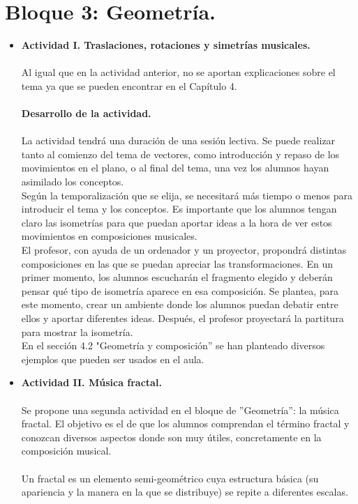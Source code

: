 \documentclass[a4paper, openright, 11pt, titlepage]{report}
\theoremstyle{definition}\newtheorem{defin}[propo]{Definition}
\theoremstyle{definition}\newtheorem{obser}[propo]{Remark}
\theoremstyle{definition}\newtheorem{ejem}[propo]{Ejemplo}
\theoremstyle{definition}\newtheorem{algoritmo}[propo]{Algoritmo}
\begin{document}
\section{Bloque 3: Geometría.}
\begin{itemize}
    \item \textbf{Actividad I. Traslaciones, rotaciones y simetrías musicales.}\\\\
    Al igual que en la actividad anterior, no se aportan explicaciones sobre el tema ya que se pueden encontrar en el Capítulo 4.\\\\
    \textbf{Desarrollo de la actividad.}\\\\
    La actividad tendrá una duración de una sesión lectiva. Se puede realizar tanto al comienzo del tema de vectores, como introducción y repaso de los movimientos en el plano, o al final del tema, una vez los alumnos hayan asimilado los conceptos.\\
    Según la temporalización que se elija, se necesitará más tiempo o menos para introducir el tema y los conceptos. Es importante que los alumnos tengan claro las isometrías para que puedan aportar ideas a la hora de ver estos movimientos en composiciones musicales.\\
    El profesor, con ayuda de un ordenador y un proyector, propondrá distintas composiciones en las que se puedan apreciar las transformaciones. En un primer momento, los alumnos escucharán el fragmento elegido y deberán pensar qué tipo de isometría aparece en esa composición. Se plantea, para este momento, crear un ambiente donde los alumnos puedan debatir entre ellos y aportar diferentes ideas. Después, el profesor proyectará la partitura para mostrar la isometría.\\
    En el sección 4.2 "Geometría y composición'' se han planteado diversos ejemplos que pueden ser usados en el aula.
    \item \textbf{Actividad II. Música fractal.}\\\\
    Se propone una segunda actividad en el bloque de ''Geometría'': la música fractal. El objetivo es el de que los alumnos comprendan el término fractal y conozcan diversos aspectos donde son muy útiles, concretamente en la composición musical.\\\\
    Un fractal es un elemento semi-geométrico cuya estructura básica (su apariencia y la manera en la que se distribuye) se repite a diferentes escalas.\\

\end{itemize}
\end{document}
